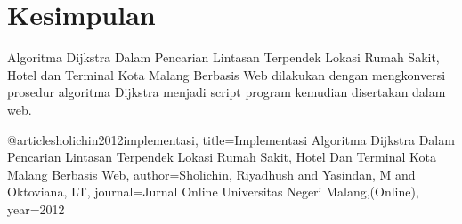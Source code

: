 \documentclass[conference]{IEEEtran}
\begin{document}
\section{Kesimpulan}
Algoritma Dijkstra Dalam Pencarian Lintasan
Terpendek Lokasi Rumah Sakit, Hotel dan Terminal Kota Malang Berbasis Web dilakukan
dengan mengkonversi prosedur algoritma Dijkstra menjadi script program kemudian
disertakan dalam web.


@article{sholichin2012implementasi,
  title={Implementasi Algoritma Dijkstra Dalam Pencarian Lintasan Terpendek Lokasi Rumah Sakit, Hotel Dan Terminal Kota Malang Berbasis Web},
  author={Sholichin, Riyadhush and Yasindan, M and Oktoviana, LT},
  journal={Jurnal Online Universitas Negeri Malang,(Online)},
  year={2012}
}

\end{document}
